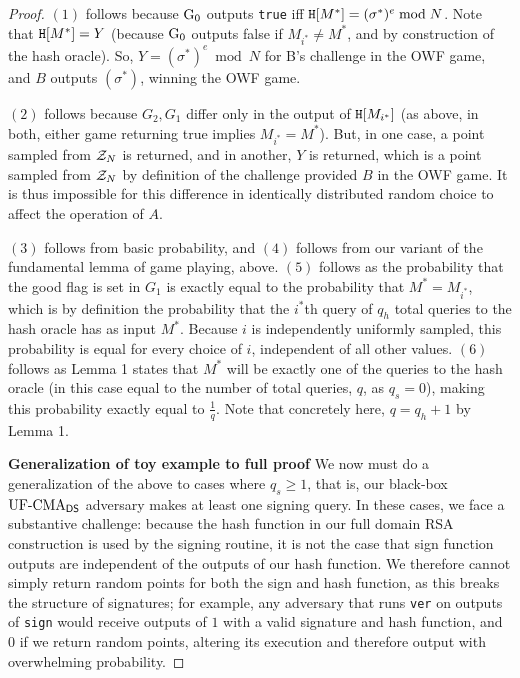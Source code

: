 \begin{proof}
$(1)$ follows because ${{\textnormal G}}_0$ outputs \texttt{true} iff $\mathtt{H}[M^*] = (\sigma^*)^e \bmod N$.  Note that $\mathtt{H}[M^*] = Y$ (because ${{\textnormal G}}_0$ outputs false if $M_{i^*}\neq M^*$, and by construction of the hash oracle).  So, $Y=(\sigma^*)^e \bmod N$ for B's challenge in the OWF game, and $B$ outputs $(\sigma^*)$, winning the OWF game.

$(2)$ follows because $G_2, G_1$ differ only in the output of $\mathtt{H}[M_{i^*}]$ (as above, in both, either game returning true implies $M_{i^*} = M^*$).  But, in one case, a point sampled from $\mathcal{Z}_N$ is returned, and in another, $Y$ is returned, which is a point sampled from $\mathcal{Z}_N$ by definition of the challenge provided $B$ in the OWF game.  It is thus impossible for this difference in identically distributed random choice to affect the operation of $A$.

$(3)$ follows from basic probability, and $(4)$ follows from our variant of the fundamental lemma of game playing, above.  $(5)$ follows as the probability that the good flag is set in $G_1$ is exactly equal to the probability that $M^* = M_{i^*}$, which is by definition the probability that the $i^*$th query of $q_h$ total queries to the hash oracle has as input $M^*$.  Because $i$ is independently uniformly sampled, this probability is equal for every choice of $i$, independent of all other values. $(6)$ follows as Lemma 1 states that $M^*$ will be exactly one of the queries to the hash oracle (in this case equal to the number of total queries, $q$, as $q_s=0$), making this probability exactly equal to $\frac{1}{q}$.  Note that concretely here, $q=q_h+1$ by Lemma 1.

\textbf{Generalization of toy example to full proof}  We now must do a generalization of the above to cases where $q_s \geq 1$, that is, our black-box $\textnormal{UF-CMA}_{\mathsf{DS}}$ adversary makes at least one signing query.  In these cases, we face a substantive challenge: because the hash function in our full domain RSA construction is used by the signing routine, it is not the case that sign function outputs are independent of the outputs of our hash function.  We therefore cannot simply return random points for both the sign and hash function, as this breaks the structure of signatures; for example, any adversary that runs \texttt{ver} on outputs of \texttt{sign} would receive outputs of $1$ with a valid signature and hash function, and $0$ if we return random points, altering its execution and therefore output with overwhelming probability.


\end{proof}
